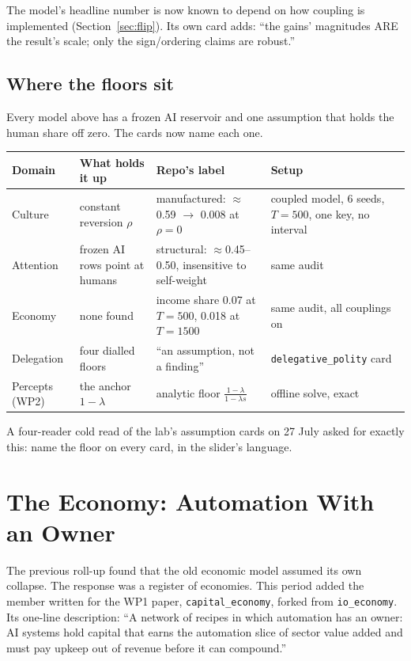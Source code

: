 \documentclass[11pt]{article}
\newcommand{\code}[1]{\texttt{#1}}
\begin{document}
The model's headline number is now known to depend on how coupling is implemented
(Section~\ref{sec:flip}). Its own card adds: ``the gains' magnitudes ARE the result's
scale; only the sign/ordering claims are robust.''

\subsection{Where the floors sit}

Every model above has a frozen AI reservoir and one assumption that holds the human
share off zero. The cards now name each one.

\begin{center}
\begin{tabular}{@{}p{3.1cm}p{3.6cm}p{3.6cm}p{4.2cm}@{}}
\toprule
\textbf{Domain} & \textbf{What holds it up} & \textbf{Repo's label} & \textbf{Setup} \\
\midrule
Culture & constant reversion $\rho$ & manufactured: $\approx$0.59 $\to$ 0.008 at $\rho=0$ & coupled model, 6 seeds, $T=500$, one key, no interval \\
Attention & frozen AI rows point at humans & structural: $\approx$0.45--0.50, insensitive to self-weight & same audit \\
Economy & none found & income share 0.07 at $T=500$, 0.018 at $T=1500$ & same audit, all couplings on \\
Delegation & four dialled floors & ``an assumption, not a finding'' & \code{delegative\_polity} card \\
Percepts (WP2) & the anchor $1-\lambda$ & analytic floor $\frac{1-\lambda}{1-\lambda s}$ & offline solve, exact \\
\bottomrule
\end{tabular}
\end{center}

\noindent A four-reader cold read of the lab's assumption cards on 27 July asked for
exactly this: name the floor on every card, in the slider's language.

\section{The Economy: Automation With an Owner}

The previous roll-up found that the old economic model assumed its own collapse. The
response was a register of economies. This period added the member written for the
WP1 paper, \code{capital\_economy}, forked from \code{io\_economy}. Its one-line
description: ``A network of recipes in which automation has an owner: AI systems hold
capital that earns the automation slice of sector value added and must pay upkeep out
of revenue before it can compound.''
\end{document}
